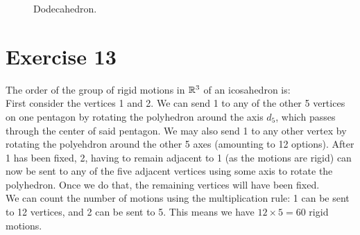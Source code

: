 \documentclass[12pt]{article}
\begin{document}
\begin{figure}[H]
        \caption{\label{fig:figure1} Dodecahedron.}
    \end{figure}


    \section*{Exercise 13}
    The order of the group of rigid motions in $\mathbb{R}^3$ of an icosahedron is: \\
    First consider the vertices 1 and 2.
    We can send 1 to any of the other 5 vertices on one pentagon by
    rotating the polyhedron around the axis $d_5$, which passes through
    the center of said pentagon. We may also send 1 to any other vertex
    by rotating the polyehdron around the other 5 axes (amounting to 12 
    options).
    After 1 has been fixed, 2, having to remain adjacent to 1 (as the
    motions are rigid) can now be sent to any of the five adjacent vertices
    using some axis to rotate the polyhedron. Once we do that, the
    remaining vertices will have been fixed. \\
    We can count the number of motions using the multiplication rule:
    1 can be sent to 12 vertices, and 2 can be sent to 5. This means we
    have $12 \times 5 = 60$ rigid motions. 
\end{document}
